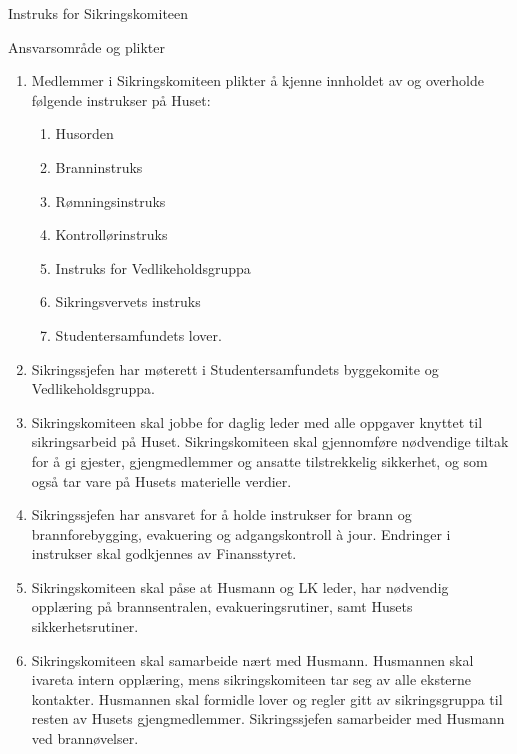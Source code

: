 \begin{instruks*}{Instruks for Sikringskomiteen}
    \begin{instruksledd}{Ansvarsområde og plikter}
        \begin{enumerate}
            \item Medlemmer i Sikringskomiteen plikter å kjenne innholdet av og overholde
                følgende instrukser på Huset:
                \begin{enumerate}
                    \item Husorden
                    \item Branninstruks
                    \item Rømningsinstruks
                    \item Kontrollørinstruks
                    \item Instruks for Vedlikeholdsgruppa
                    \item Sikringsvervets instruks
                    \item Studentersamfundets lover.
                \end{enumerate}
            \item Sikringssjefen har møterett i Studentersamfundets byggekomite og
                Vedlikeholdsgruppa.
            \item Sikringskomiteen skal jobbe for daglig leder med alle oppgaver knyttet
                til sikringsarbeid på Huset.
                Sikringskomiteen skal gjennomføre nødvendige tiltak for å gi gjester,
                gjengmedlemmer og ansatte
                tilstrekkelig sikkerhet, og som også tar vare på Husets materielle
                verdier.
            \item Sikringssjefen har ansvaret for å holde instrukser for brann og
                brannforebygging, evakuering og
                adgangskontroll à jour. Endringer i instrukser skal godkjennes av
                Finansstyret.
            \item Sikringskomiteen skal påse at Husmann og LK leder, har nødvendig
                opplæring på brannsentralen,
                evakueringsrutiner, samt Husets sikkerhetsrutiner.
            \item Sikringskomiteen skal samarbeide nært med Husmann. Husmannen skal ivareta
                intern opplæring, mens
                sikringskomiteen tar seg av alle eksterne kontakter. Husmannen skal
                formidle lover og regler gitt av
                sikringsgruppa til resten av Husets gjengmedlemmer. Sikringssjefen
                samarbeider med Husmann ved brannøvelser.

\end{enumerate}
\end{instruksledd}
\end{instruks*}
